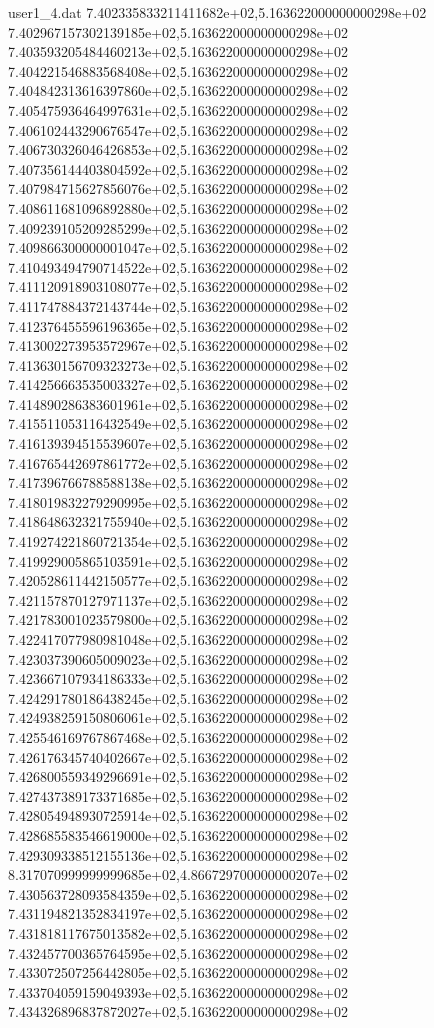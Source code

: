 \begin{filecontents}{user1_4.dat}
7.402335833211411682e+02,5.163622000000000298e+02
7.402967157302139185e+02,5.163622000000000298e+02
7.403593205484460213e+02,5.163622000000000298e+02
7.404221546883568408e+02,5.163622000000000298e+02
7.404842313616397860e+02,5.163622000000000298e+02
7.405475936464997631e+02,5.163622000000000298e+02
7.406102443290676547e+02,5.163622000000000298e+02
7.406730326046426853e+02,5.163622000000000298e+02
7.407356144403804592e+02,5.163622000000000298e+02
7.407984715627856076e+02,5.163622000000000298e+02
7.408611681096892880e+02,5.163622000000000298e+02
7.409239105209285299e+02,5.163622000000000298e+02
7.409866300000001047e+02,5.163622000000000298e+02
7.410493494790714522e+02,5.163622000000000298e+02
7.411120918903108077e+02,5.163622000000000298e+02
7.411747884372143744e+02,5.163622000000000298e+02
7.412376455596196365e+02,5.163622000000000298e+02
7.413002273953572967e+02,5.163622000000000298e+02
7.413630156709323273e+02,5.163622000000000298e+02
7.414256663535003327e+02,5.163622000000000298e+02
7.414890286383601961e+02,5.163622000000000298e+02
7.415511053116432549e+02,5.163622000000000298e+02
7.416139394515539607e+02,5.163622000000000298e+02
7.416765442697861772e+02,5.163622000000000298e+02
7.417396766788588138e+02,5.163622000000000298e+02
7.418019832279290995e+02,5.163622000000000298e+02
7.418648632321755940e+02,5.163622000000000298e+02
7.419274221860721354e+02,5.163622000000000298e+02
7.419929005865103591e+02,5.163622000000000298e+02
7.420528611442150577e+02,5.163622000000000298e+02
7.421157870127971137e+02,5.163622000000000298e+02
7.421783001023579800e+02,5.163622000000000298e+02
7.422417077980981048e+02,5.163622000000000298e+02
7.423037390605009023e+02,5.163622000000000298e+02
7.423667107934186333e+02,5.163622000000000298e+02
7.424291780186438245e+02,5.163622000000000298e+02
7.424938259150806061e+02,5.163622000000000298e+02
7.425546169767867468e+02,5.163622000000000298e+02
7.426176345740402667e+02,5.163622000000000298e+02
7.426800559349296691e+02,5.163622000000000298e+02
7.427437389173371685e+02,5.163622000000000298e+02
7.428054948930725914e+02,5.163622000000000298e+02
7.428685583546619000e+02,5.163622000000000298e+02
7.429309338512155136e+02,5.163622000000000298e+02
8.317070999999999685e+02,4.866729700000000207e+02
7.430563728093584359e+02,5.163622000000000298e+02
7.431194821352834197e+02,5.163622000000000298e+02
7.431818117675013582e+02,5.163622000000000298e+02
7.432457700365764595e+02,5.163622000000000298e+02
7.433072507256442805e+02,5.163622000000000298e+02
7.433704059159049393e+02,5.163622000000000298e+02
7.434326896837872027e+02,5.163622000000000298e+02

\end{filecontents}
